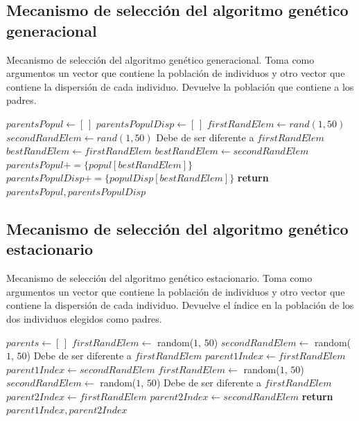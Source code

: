 \subsection{Mecanismo de selección del algoritmo genético generacional}
\begin{algorithm}[H]
    \caption{Mecanismo de selección del algoritmo genético generacional. Toma como argumentos un vector que contiene la población de individuos y otro vector que contiene la dispersión de cada individuo. Devuelve la población que contiene a los padres.}
\begin{algorithmic}
    \State $parentsPopul \leftarrow [ \, ]$
    \State $parentsPopulDisp \leftarrow [ \, ]$
        \State $firstRandElem \leftarrow rand(1,50)$
        \State $secondRandElem \leftarrow rand(1,50)$ \Comment Debe de ser diferente a $firstRandElem$
        \State
        \State $bestRandElem \leftarrow firstRandElem$
            \State $bestRandElem \leftarrow secondRandElem$
        \EndIf
        \State
        \State $parentsPopul += \{popul[bestRandElem]\}$
        \State $parentsPopulDisp += \{populDisp[bestRandElem]\}$
        \State \textbf{return} $parentsPopul, parentsPopulDisp$
    \EndFor
\EndProcedure
\end{algorithmic}
\end{algorithm}


\subsection{Mecanismo de selección del algoritmo genético estacionario}
\begin{algorithm}[H]
    \caption{Mecanismo de selección del algoritmo genético estacionario. Toma como argumentos un vector que contiene la población de individuos y otro vector que contiene la dispersión de cada individuo. Devuelve el índice en la población de los dos individuos elegidos como padres.}
\begin{algorithmic}
    \State $parents \leftarrow [ \, ]$
    \State 
    \State $firstRandElem \leftarrow$ random($1$, $50$) 
    \State $secondRandElem \leftarrow$ random($1$, $50$) \Comment Debe de ser diferente a $firstRandElem$
    \State
    \State $parent1Index \leftarrow firstRandElem$
        \State $parent1Index \leftarrow secondRandElem$
    \EndIf
    \State 
    \State $firstRandElem \leftarrow$ random($1$, $50$) 
    \State $secondRandElem \leftarrow$ random($1$, $50$) \Comment Debe de ser diferente a $firstRandElem$
    \State
    \State $parent2Index \leftarrow firstRandElem$
        \State $parent2Index \leftarrow secondRandElem$
    \EndIf
    \State \textbf{return} $parent1Index, parent2Index$
\EndProcedure
\end{algorithmic}
\end{algorithm}


